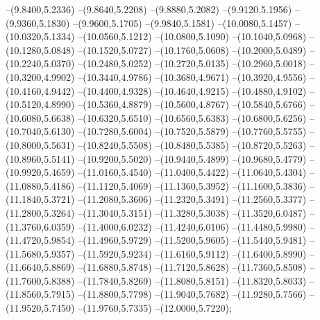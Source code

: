 {	--(9.8400,5.2336)
	--(9.8640,5.2208)
	--(9.8880,5.2082)
	--(9.9120,5.1956)
	--(9.9360,5.1830)
	--(9.9600,5.1705)
	--(9.9840,5.1581)
	--(10.0080,5.1457)
	--(10.0320,5.1334)
	--(10.0560,5.1212)
	--(10.0800,5.1090)
	--(10.1040,5.0968)
	--(10.1280,5.0848)
	--(10.1520,5.0727)
	--(10.1760,5.0608)
	--(10.2000,5.0489)
	--(10.2240,5.0370)
	--(10.2480,5.0252)
	--(10.2720,5.0135)
	--(10.2960,5.0018)
	--(10.3200,4.9902)
	--(10.3440,4.9786)
	--(10.3680,4.9671)
	--(10.3920,4.9556)
	--(10.4160,4.9442)
	--(10.4400,4.9328)
	--(10.4640,4.9215)
	--(10.4880,4.9102)
	--(10.5120,4.8990)
	--(10.5360,4.8879)
	--(10.5600,4.8767)
	--(10.5840,5.6766)
	--(10.6080,5.6638)
	--(10.6320,5.6510)
	--(10.6560,5.6383)
	--(10.6800,5.6256)
	--(10.7040,5.6130)
	--(10.7280,5.6004)
	--(10.7520,5.5879)
	--(10.7760,5.5755)
	--(10.8000,5.5631)
	--(10.8240,5.5508)
	--(10.8480,5.5385)
	--(10.8720,5.5263)
	--(10.8960,5.5141)
	--(10.9200,5.5020)
	--(10.9440,5.4899)
	--(10.9680,5.4779)
	--(10.9920,5.4659)
	--(11.0160,5.4540)
	--(11.0400,5.4422)
	--(11.0640,5.4304)
	--(11.0880,5.4186)
	--(11.1120,5.4069)
	--(11.1360,5.3952)
	--(11.1600,5.3836)
	--(11.1840,5.3721)
	--(11.2080,5.3606)
	--(11.2320,5.3491)
	--(11.2560,5.3377)
	--(11.2800,5.3264)
	--(11.3040,5.3151)
	--(11.3280,5.3038)
	--(11.3520,6.0487)
	--(11.3760,6.0359)
	--(11.4000,6.0232)
	--(11.4240,6.0106)
	--(11.4480,5.9980)
	--(11.4720,5.9854)
	--(11.4960,5.9729)
	--(11.5200,5.9605)
	--(11.5440,5.9481)
	--(11.5680,5.9357)
	--(11.5920,5.9234)
	--(11.6160,5.9112)
	--(11.6400,5.8990)
	--(11.6640,5.8869)
	--(11.6880,5.8748)
	--(11.7120,5.8628)
	--(11.7360,5.8508)
	--(11.7600,5.8388)
	--(11.7840,5.8269)
	--(11.8080,5.8151)
	--(11.8320,5.8033)
	--(11.8560,5.7915)
	--(11.8800,5.7798)
	--(11.9040,5.7682)
	--(11.9280,5.7566)
	--(11.9520,5.7450)
	--(11.9760,5.7335)
	--(12.0000,5.7220);
}
